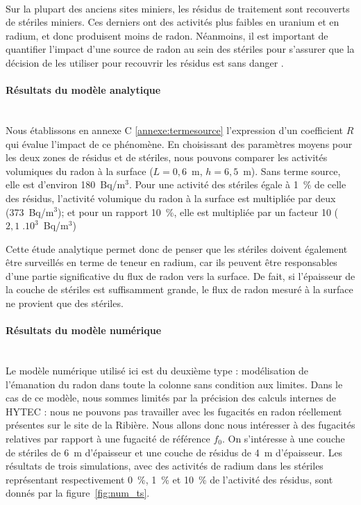\documentclass{article}
\begin{document}
\paragraph{} Sur la plupart des anciens sites miniers, les résidus de traitement sont recouverts de stériles miniers. Ces derniers ont des activités plus faibles en uranium et en radium, et donc produisent moins de radon. Néanmoins, il est important de quantifier l'impact d'une source de radon au sein des stériles pour s'assurer que la décision de les utiliser pour recouvrir les résidus est sans danger \cite{ferry_evaluation_2002}.

\paragraph{Résultats du modèle analytique \\ \\}
Nous établissons en annexe C \ref{annexe:termesource} l'expression d'un coefficient $R$ qui évalue l'impact de ce phénomène. En choisissant des paramètres moyens pour les deux zones de résidus et de stériles, nous pouvons comparer les activités volumiques du radon à la surface ($L=0,6$~m, $h=6,5$~m). Sans terme source, elle est d'environ 180~Bq/m$^3$. Pour une activité des stériles égale à 1~\% de celle des résidus, l'activité volumique du radon à la surface est multipliée par deux (373~Bq/m$^3$); et pour un rapport 10~\%, elle est multipliée par un facteur 10 ($2,1 \; .10^3$~Bq/m$^3$)

Cette étude analytique permet donc de penser que les stériles doivent également être surveillés en terme de teneur en radium, car ils peuvent être responsables d'une partie significative du flux de radon vers la surface. De fait, si l'épaisseur de la couche de stériles est suffisamment grande, le flux de radon mesuré à la surface ne provient que des stériles.

\paragraph{Résultats du modèle numérique \\ \\}
Le modèle numérique utilisé ici est du deuxième type : modélisation de l'émanation du radon dans toute la colonne sans condition aux limites. Dans le cas de ce modèle, nous sommes limités par la précision des calculs internes de HYTEC : nous ne pouvons pas travailler avec les fugacités en radon réellement présentes sur le site de la Ribière. Nous allons donc nous intéresser à des fugacités relatives par rapport à une fugacité de référence $f_0$. On s'intéresse à une couche de stériles de 6~m d'épaisseur et une couche de résidus de 4~m d'épaisseur. Les résultats de trois simulations, avec des activités de radium dans les stériles représentant respectivement 0~\%, 1~\% et 10~\% de l'activité des résidus, sont donnés par la figure~\ref{fig:num_ts}.
\end{document}
